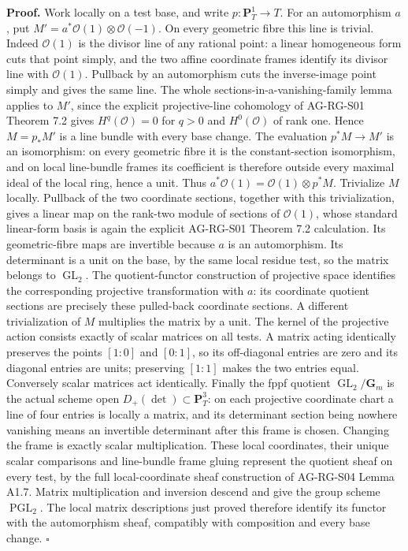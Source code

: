 \documentclass[11pt,a4paper,openany]{report}
\begin{document}
\textbf{Proof.} Work locally on a test base, and write \(p:\mathbf P^1_T\to T\). For an automorphism \(a\), put \(M'=a^*\mathcal O(1)\otimes\mathcal O(-1)\). On every geometric fibre this line is trivial. Indeed \(\mathcal O(1)\) is the divisor line of any rational point: a linear homogeneous form cuts that point simply, and the two affine coordinate frames identify its divisor line with \(\mathcal O(1)\). Pullback by an automorphism cuts the inverse-image point simply and gives the same line. The whole sections-in-a-vanishing-family lemma applies to \(M'\), since the explicit projective-line cohomology of AG-RG-S01 Theorem 7.2 gives \(H^q(\mathcal O)=0\) for \(q>0\) and \(H^0(\mathcal O)\) of rank one. Hence \(M=p_*M'\) is a line bundle with every base change. The evaluation \(p^*M\to M'\) is an isomorphism: on every geometric fibre it is the constant-section isomorphism, and on local line-bundle frames its coefficient is therefore outside every maximal ideal of the local ring, hence a unit. Thus \(a^*\mathcal O(1)=\mathcal O(1)\otimes p^*M\). Trivialize \(M\) locally. Pullback of the two coordinate sections, together with this trivialization, gives a linear map on the rank-two module of sections of \(\mathcal O(1)\), whose standard linear-form basis is again the explicit AG-RG-S01 Theorem 7.2 calculation. Its geometric-fibre maps are invertible because \(a\) is an automorphism. Its determinant is a unit on the base, by the same local residue test, so the matrix belongs to \(\operatorname{GL}_2\). The quotient-functor construction of projective space identifies the corresponding projective transformation with \(a\): its coordinate quotient sections are precisely these pulled-back coordinate sections. A different trivialization of \(M\) multiplies the matrix by a unit. The kernel of the projective action consists exactly of scalar matrices on all tests. A matrix acting identically preserves the points \([1:0]\) and \([0:1]\), so its off-diagonal entries are zero and its diagonal entries are units; preserving \([1:1]\) makes the two entries equal. Conversely scalar matrices act identically. Finally the fppf quotient \(\operatorname{GL}_2/\mathbf G_m\) is the actual scheme open \(D_+(\det)\subset\mathbf P^3_T\): on each projective coordinate chart a line of four entries is locally a matrix, and its determinant section being nowhere vanishing means an invertible determinant after this frame is chosen. Changing the frame is exactly scalar multiplication. These local coordinates, their unique scalar comparisons and line-bundle frame gluing represent the quotient sheaf on every test, by the full local-coordinate sheaf construction of AG-RG-S04 Lemma A1.7. Matrix multiplication and inversion descend and give the group scheme \(\operatorname{PGL}_2\). The local matrix descriptions just proved therefore identify its functor with the automorphism sheaf, compatibly with composition and every base change. \(\square\)
\end{document}
